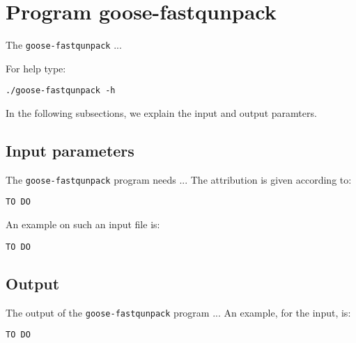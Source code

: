 \section{Program goose-fastqunpack}
The \texttt{goose-fastqunpack} ...

For help type:
\begin{lstlisting}
./goose-fastqunpack -h
\end{lstlisting}
In the following subsections, we explain the input and output paramters.

\subsection*{Input parameters}

The \texttt{goose-fastqunpack} program needs ...
The attribution is given according to:
\begin{lstlisting}
TO DO
\end{lstlisting}

An example on such an input file is:
\begin{lstlisting}
TO DO
\end{lstlisting}

\subsection*{Output}
The output of the \texttt{goose-fastqunpack} program ...
An example, for the input, is:
\begin{lstlisting}
TO DO
\end{lstlisting}
